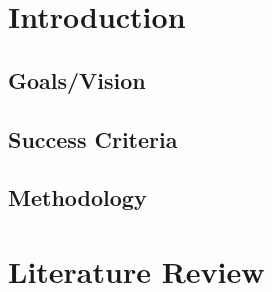 \documentclass [11pt, proquest] {uwthesis}[2020/02/24]
\begin{document}
\tableofcontents
\listoffigures

\textpages


\chapter{Introduction}

\section{Goals/Vision}


\section{Success Criteria}



\section{Methodology}


\chapter{Literature Review}



%


\end{document}
